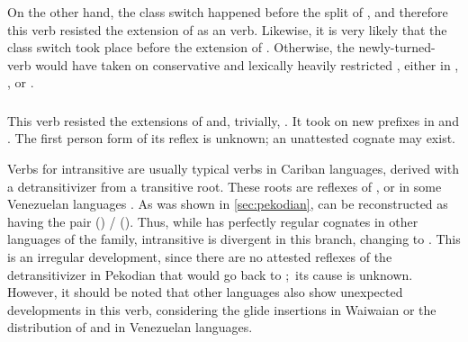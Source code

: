 On the other hand, the class switch happened before the split of \PTir, and therefore this verb resisted the extension of \akuriyo {} as an  verb.
Likewise, it is very likely that the class switch took place before the extension of \PPek {}.
Otherwise, the newly-turned- verb would have taken on conservative and lexically heavily restricted , either in \PPek, \PXin, or \arara.

\subsubsection{ }
\label{sec:bathe}
This verb resisted the extensions of \PPek {}  and, trivially, \akuriyo {} .
It took on new  prefixes in \PTir {} and \PWai {}.
The first person form of its \carijo reflex  \parencites[72]{koch1908hiana} is unknown; an unattested \yukpa cognate may exist.

Verbs for intransitive  are usually typical  verbs in Cariban languages, derived with a detransitivizer from a transitive root.
These roots are reflexes of , or  in some Venezuelan languages .
As was shown in \cref{sec:pekodian}, \PPek can be reconstructed as having the pair  () /  ().
Thus, while \PPek {} has perfectly regular cognates in other languages of the family, intransitive  is divergent in this branch, changing  to .
This is an irregular development, since there are no attested reflexes of the detransitivizer in Pekodian that would go back to \PPek {} \parencite[506]{meira2010origin}; its cause is unknown.
However, it should be noted that other languages also show unexpected developments in this verb, considering the glide insertions in Waiwaian or the distribution of  and  in Venezuelan languages.




